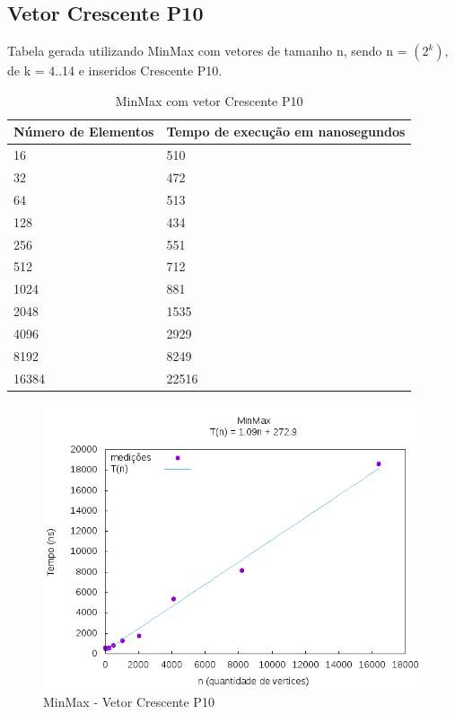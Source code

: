 \documentclass[12pt,a4paper,twoside]{report}
\begin{document}
\subsection{Vetor Crescente P10}
Tabela gerada utilizando MinMax com vetores de tamanho n, sendo n = $(2^k)$, de k = 4..14 e inseridos Crescente P10.
\begin{table}[H]
\centering
\caption{MinMax com vetor Crescente P10}
\label{my-label}
\begin{tabular}{|l|l|}
\hline
\multicolumn{1}{|c|}{\textbf{Número de Elementos}} & \multicolumn{1}{c|}{\textbf{Tempo de execução em nanosegundos}} \\ \hline
16 & 510 \\ \hline
32 & 472 \\ \hline
64 & 513 \\ \hline
128 & 434 \\ \hline
256 & 551 \\ \hline
512 & 712 \\ \hline
1024 & 881 \\ \hline
2048 & 1535 \\ \hline
4096 & 2929 \\ \hline
8192 & 8249 \\ \hline
16384 & 22516 \\ \hline
\end{tabular}
\end{table}

\begin{figure}[H]
    \centering
    \includegraphics[width=0.7\linewidth]{graficos/Min Max/Crescente P10/MinMax.png}
  \caption{MinMax - Vetor Crescente P10}
\end{figure}
\end{document}
